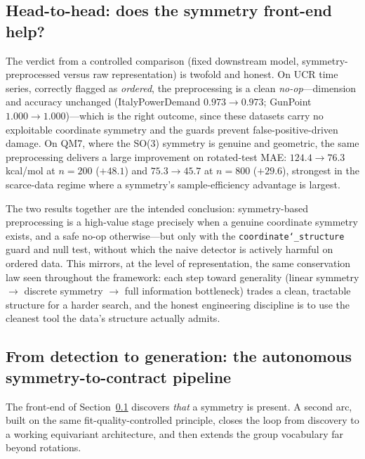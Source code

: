 \documentclass[11pt]{article}
\newcommand{\allowbreakhere}{\discretionary{}{}{}}
\newcommand{\code}[1]{\texttt{\def\_{\char`_\allowbreakhere}#1}}
\begin{document}
\subsection{Head-to-head: does the symmetry front-end help?}
\label{sec:symmetryhead}

The verdict from a controlled comparison (fixed downstream model, symmetry-preprocessed versus raw
representation) is twofold and honest. On UCR time series, correctly flagged as \emph{ordered}, the
preprocessing is a clean \emph{no-op}---dimension and accuracy unchanged (ItalyPowerDemand
$0.973\to0.973$; GunPoint $1.000\to1.000$)---which is the right outcome, since these datasets carry
no exploitable coordinate symmetry and the guards prevent false-positive-driven damage. On QM7,
where the SO(3) symmetry is genuine and geometric, the same preprocessing delivers a large
improvement on rotated-test MAE: $124.4\to76.3$ kcal/mol at $n{=}200$ ($+48.1$) and
$75.3\to45.7$ at $n{=}800$ ($+29.6$), strongest in the scarce-data regime where a symmetry's
sample-efficiency advantage is largest.

The two results together are the intended conclusion: symmetry-based preprocessing is a high-value
stage precisely when a genuine coordinate symmetry exists, and a safe no-op otherwise---but only
with the \code{coordinate\_structure} guard and null test, without which the naive detector is
actively harmful on ordered data. This mirrors, at the level of representation, the same
conservation law seen throughout the framework: each step toward generality (linear symmetry
$\to$ discrete symmetry $\to$ full information bottleneck) trades a clean, tractable structure for a
harder search, and the honest engineering discipline is to use the cleanest tool the data's
structure actually admits.



\subsection{From detection to generation: the autonomous symmetry-to-contract pipeline}
\label{sec:autonomoussymmetry}

The front-end of Section~\ref{sec:symmetryhead} discovers \emph{that} a symmetry is present. A second arc,
built on the same fit-quality-controlled principle, closes the loop from discovery to a working
equivariant architecture, and then extends the group vocabulary far beyond rotations.
\end{document}
